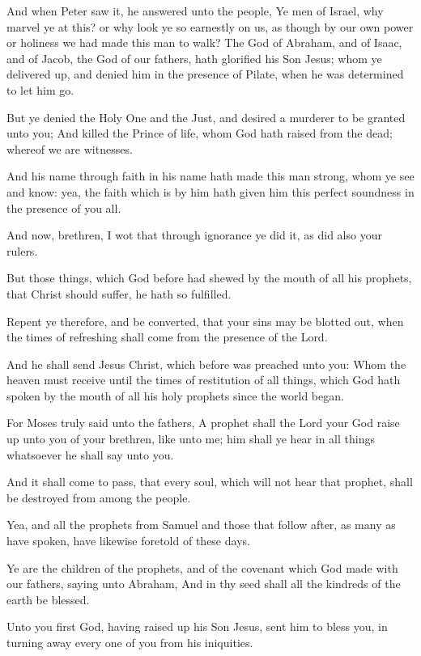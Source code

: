 \verse And when Peter saw it, he answered unto the people, Ye men of Israel, why marvel ye at this? or why look ye so earnestly on us, as though by our own power or holiness we had made this man to walk?  \verse The God of Abraham, and of Isaac, and of Jacob, the God of our fathers, hath glorified his Son Jesus; whom ye delivered up, and denied him in the presence of Pilate, when he was determined to let him go.

\verse But ye denied the Holy One and the Just, and desired a murderer to be granted unto you; \verse And killed the Prince of life, whom God hath raised from the dead; whereof we are witnesses.

\verse And his name through faith in his name hath made this man strong, whom ye see and know: yea, the faith which is by him hath given him this perfect soundness in the presence of you all.

\verse And now, brethren, I wot that through ignorance ye did it, as did also your rulers.

\verse But those things, which God before had shewed by the mouth of all his prophets, that Christ should suffer, he hath so fulfilled.

\verse Repent ye therefore, and be converted, that your sins may be blotted out, when the times of refreshing shall come from the presence of the Lord.

\verse And he shall send Jesus Christ, which before was preached unto you: \verse Whom the heaven must receive until the times of restitution of all things, which God hath spoken by the mouth of all his holy prophets since the world began.

\verse For Moses truly said unto the fathers, A prophet shall the Lord your God raise up unto you of your brethren, like unto me; him shall ye hear in all things whatsoever he shall say unto you.

\verse And it shall come to pass, that every soul, which will not hear that prophet, shall be destroyed from among the people.

\verse Yea, and all the prophets from Samuel and those that follow after, as many as have spoken, have likewise foretold of these days.

\verse Ye are the children of the prophets, and of the covenant which God made with our fathers, saying unto Abraham, And in thy seed shall all the kindreds of the earth be blessed.

\verse Unto you first God, having raised up his Son Jesus, sent him to bless you, in turning away every one of you from his iniquities.


